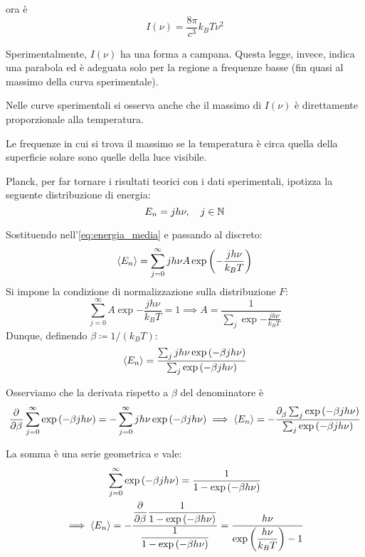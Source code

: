 ora è
\begin{equation}
    I(\nu) = \frac{8\pi}{c^3} k_B T \nu^2
\end{equation}

Sperimentalmente, $I(\nu)$ ha una forma a campana.
Questa legge, invece, indica una parabola ed è adeguata solo per la regione a frequenze basse (fin quasi al massimo della curva sperimentale).

Nelle curve sperimentali si osserva anche che il massimo di $I(\nu)$ è direttamente proporzionale alla temperatura.

Le frequenze in cui si trova il massimo se la temperatura è circa quella della superficie solare sono quelle della luce visibile.

Planck, per far tornare i risultati teorici con i dati sperimentali, ipotizza la seguente distribuzione di energia:
\begin{equation}
    {E_n} = j h \nu, \quad j \in \mathbb{N}
\end{equation}

Sostituendo nell'\cref{eq:energia_media} e passando al discreto:
\begin{equation}
    \left\langle {E_n} \right\rangle = \sum_{j = 0}^{\infty} j h \nu A \operatorname{exp}\left( -\frac{j h \nu}{k_B T} \right)
\end{equation}
Si impone la condizione di normalizzazione sulla distribuzione $F$:
\begin{equation}
    \sum_{j = 0}^{\infty} A \exp{-\frac{j h \nu}{k_B T}} = 1
    \implies A = \frac{1}{\sum_j \exp{-\frac{j h \nu}{k_B T}}}
\end{equation}
Dunque, definendo $\beta \coloneq 1/(k_B T)$:
\begin{equation}
    \left\langle {E_n} \right\rangle = \frac{\sum_j j h \nu \operatorname{exp}\left( -\beta j h \nu \right)}{\sum_j \operatorname{exp}\left( -\beta j h \nu \right)}
\end{equation}

Osserviamo che la derivata rispetto a $\beta$ del denominatore è
\begin{equation}
    \parder{\beta} \sum_{j = 0}^\infty \exp{-\beta j h \nu}
    = - \sum_{j = 0}^\infty j h \nu \exp{-\beta j h \nu} \implies \avg{\energy}
    = -\frac{\parder{\beta} \sum_j \exp{-\beta j h \nu}}{\sum_j \exp{-\beta j h \nu}}
\end{equation}

La somma è una serie geometrica e vale:
\begin{gather}
    \sum_{j = 0}^\infty \exp{-\beta j h \nu} = \frac{1}{1 - \exp{-\beta h \nu}} \\
    \implies
    \avg{\energy} = -\frac{\displaystyle\parder{\beta} \dfrac{1}{1 - \exp{-\beta h \nu}}}{\dfrac{1}{1 - \exp{-\beta h \nu}}}
    = \frac{h \nu}{\exp{\dfrac{h \nu}{k_B T}} - 1}
\end{gather}

